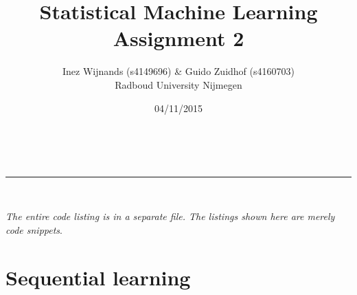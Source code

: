 \documentclass[a4paper,10pt]{article}
\makeatletter
\numberwithin{equation}{section} %
\numberwithin{figure}{section} %
\numberwithin{table}{section} %
\newcommand{\linia}{\rule{\linewidth}{0.5pt}}
\theoremstyle{mytheor}
\renewcommand{\maketitle}{
\begin{center}
\vspace{2ex}
{\huge \textsc{\@title}}
\vspace{1ex}
\\
\linia\\
\@author  \@date
\vspace{4ex}
\end{center}
}
\makeatother
\begin{document}
\title{Statistical Machine Learning \\ Assignment 2}

\author{Inez Wijnands (s4149696) \& Guido Zuidhof (s4160703)\\ Radboud University Nijmegen\\}

\date{04/11/2015}

\maketitle

\noindent \textit{The entire code listing is in a separate file. The listings shown here are merely code snippets}.\vspace{-0.5cm}
\section{Sequential learning}
\end{document}
